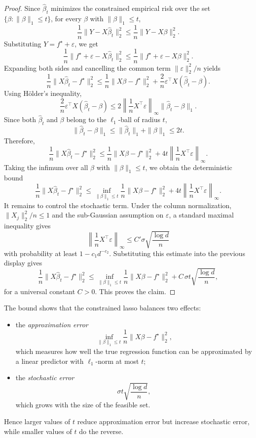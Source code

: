 \begin{proof}
Since \(\hat\beta_t\) minimizes the constrained empirical risk over the set
\(\{\beta:\|\beta\|_1\le t\}\), for every \(\beta\) with \(\|\beta\|_1\le t\),
\[
\frac{1}{n}\|Y-X\hat\beta_t\|_2^2
\le
\frac{1}{n}\|Y-X\beta\|_2^2.
\]
Substituting \(Y=f^\star+\varepsilon\), we get
\[
\frac{1}{n}\|f^\star+\varepsilon-X\hat\beta_t\|_2^2
\le
\frac{1}{n}\|f^\star+\varepsilon-X\beta\|_2^2.
\]
Expanding both sides and cancelling the common term \(\|\varepsilon\|_2^2/n\) yields
\[
\frac{1}{n}\|X\hat\beta_t-f^\star\|_2^2
\le
\frac{1}{n}\|X\beta-f^\star\|_2^2
+
\frac{2}{n}\varepsilon^\top X(\hat\beta_t-\beta).
\]
Using Hölder's inequality,
\[
\frac{2}{n}\varepsilon^\top X(\hat\beta_t-\beta)
\le
2\left\|\frac{1}{n}X^\top\varepsilon\right\|_\infty
\|\hat\beta_t-\beta\|_1.
\]
Since both \(\hat\beta_t\) and \(\beta\) belong to the \(\ell_1\)-ball of radius \(t\),
\[
\|\hat\beta_t-\beta\|_1
\le
\|\hat\beta_t\|_1+\|\beta\|_1
\le
2t.
\]
Therefore,
\[
\frac{1}{n}\|X\hat\beta_t-f^\star\|_2^2
\le
\frac{1}{n}\|X\beta-f^\star\|_2^2
+
4t\left\|\frac{1}{n}X^\top\varepsilon\right\|_\infty.
\]
Taking the infimum over all \(\beta\) with \(\|\beta\|_1\le t\), we obtain the deterministic bound
\[
\frac{1}{n}\|X\hat\beta_t-f^\star\|_2^2
\le
\inf_{\|\beta\|_1\le t}
\frac{1}{n}\|X\beta-f^\star\|_2^2
+
4t\left\|\frac{1}{n}X^\top\varepsilon\right\|_\infty.
\]
It remains to control the stochastic term. Under the column normalization, \(\|X_j\|_2^2/n\le 1\) and the sub-Gaussian assumption on \(\varepsilon\), a standard maximal inequality gives
\[
\left\|\frac{1}{n}X^\top\varepsilon\right\|_\infty
\le
C'\sigma\sqrt{\frac{\log d}{n}}
\]
with probability at least \(1-c_1 d^{-c_2}\). Substituting this estimate into the previous display gives
\[
\frac{1}{n}\|X\hat\beta_t-f^\star\|_2^2
\le
\inf_{\|\beta\|_1\le t}
\frac{1}{n}\|X\beta-f^\star\|_2^2
+
C\,\sigma t\sqrt{\frac{\log d}{n}},
\]
for a universal constant \(C>0\). This proves the claim.
\end{proof}

\begin{remark}
The bound shows that the constrained lasso balances two effects:
\begin{itemize}
    \item the \emph{approximation error}
    \[
    \inf_{\|\beta\|_1\le t}\frac{1}{n}\|X\beta-f^\star\|_2^2,
    \]
    which measures how well the true regression function can be approximated by a linear predictor with \(\ell_1\)-norm at most \(t\);
    \item the \emph{stochastic error}
    \[
    \sigma t\sqrt{\frac{\log d}{n}},
    \]
    which grows with the size of the feasible set.
\end{itemize}
Hence larger values of \(t\) reduce approximation error but increase stochastic error, while smaller values of \(t\) do the reverse.
\end{remark}


